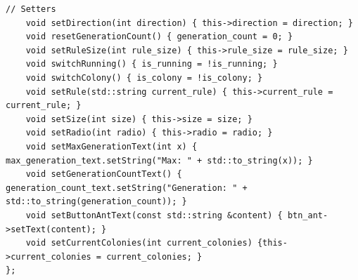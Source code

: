 \documentclass[12pt,twoside]{article}
\begin{document}
\begin{lstlisting}[caption={GUI.hpp}, label={lst:cppexample}]
	// Setters
	void setDirection(int direction) { this->direction = direction; }
	void resetGenerationCount() { generation_count = 0; }
	void setRuleSize(int rule_size) { this->rule_size = rule_size; }
	void switchRunning() { is_running = !is_running; }
	void switchColony() { is_colony = !is_colony; }
	void setRule(std::string current_rule) { this->current_rule = current_rule; }
	void setSize(int size) { this->size = size; }
	void setRadio(int radio) { this->radio = radio; }
	void setMaxGenerationText(int x) { max_generation_text.setString("Max: " + std::to_string(x)); }
	void setGenerationCountText() { generation_count_text.setString("Generation: " + std::to_string(generation_count)); }
	void setButtonAntText(const std::string &content) { btn_ant->setText(content); }
	void setCurrentColonies(int current_colonies) {this->current_colonies = current_colonies; }
};
\end{lstlisting}
\end{document}
